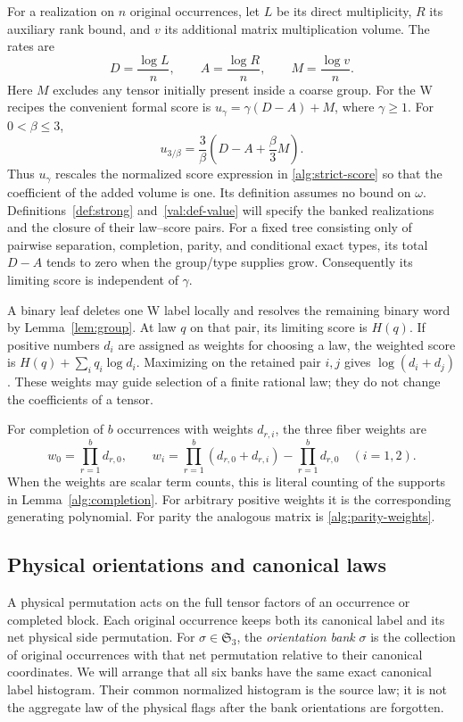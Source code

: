 \documentclass[11pt]{article}
\numberwithin{equation}{section}
\theoremstyle{definition}
\theoremstyle{remark}
\begin{document}
For a realization on \(n\) original occurrences, let \(L\) be its direct
multiplicity, \(R\) its auxiliary rank bound, and \(v\) its additional
matrix multiplication volume.  The rates are
\[
 D=\frac{\log L}{n},\qquad A=\frac{\log R}{n},\qquad
 M=\frac{\log v}{n}.
\]
Here \(M\) excludes any tensor initially present inside a coarse group.
For the W recipes the convenient formal score is
\(u_\gamma=\gamma(D-A)+M\), where \(\gamma\geq1\).
For \(0<\beta\leq3\),
\[
 u_{3/\beta}=\frac3\beta\left(D-A+\frac\beta3M\right).
\]
Thus \(u_\gamma\) rescales the normalized score expression in
\eqref{alg:strict-score} so that the coefficient of the added volume is one.
Its definition assumes no bound on \(\omega\).
Definitions~\ref{def:strong} and~\ref{val:def-value} will specify the
banked realizations and the closure of their law--score pairs.
For a fixed tree consisting only of
pairwise separation, completion, parity, and conditional exact types,
its total \(D-A\) tends to zero when the group/type supplies grow.
Consequently its limiting score is independent of \(\gamma\).

A binary leaf deletes one W label locally and resolves the remaining
binary word by Lemma~\ref{lem:group}.  At law \(q\) on that pair, its
limiting score is \(H(q)\).  If positive numbers \(d_i\) are assigned as
weights for choosing a law, the weighted score is
\(H(q)+\sum_iq_i\log d_i\).  Maximizing on the retained pair \(i,j\)
gives \(\log(d_i+d_j)\).  These weights may guide selection of a finite
rational law; they do not change the coefficients of a tensor.

For completion of \(b\) occurrences with weights \(d_{r,i}\), the three
fiber weights are
\begin{equation}
 w_0=\prod_{r=1}^b d_{r,0},\qquad
 w_i=\prod_{r=1}^b(d_{r,0}+d_{r,i})-\prod_{r=1}^b d_{r,0}
 \quad(i=1,2).
 \label{alg:complete-weights}
\end{equation}
When the weights are scalar term counts, this is literal counting of the
supports in Lemma~\ref{alg:completion}.  For arbitrary positive weights
it is the corresponding generating polynomial.  For parity the analogous
matrix is \eqref{alg:parity-weights}.

\subsection{Physical orientations and canonical laws}

A physical permutation acts on the full tensor factors of an occurrence or
completed block.  Each original occurrence keeps both its canonical label
and its net physical side permutation.  For
\(\sigma\in\mathfrak S_3\), the \emph{orientation bank} \(\sigma\)
is the collection of original occurrences with that net permutation
relative to their canonical coordinates.  We will arrange that all six
banks have the same exact canonical label histogram.  Their common
normalized histogram is the source law; it is not the aggregate law of the
physical flags after the bank orientations are forgotten.
\end{document}
